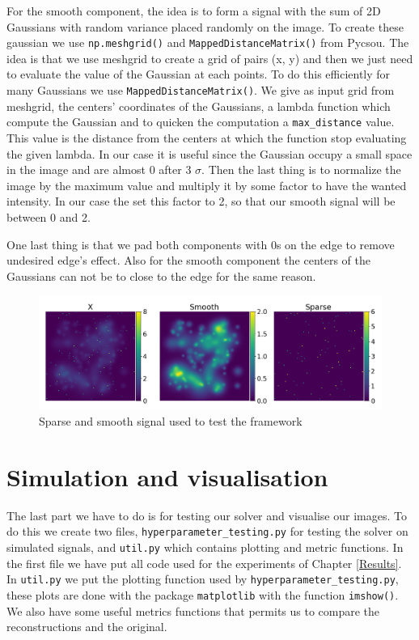 \documentclass[a4paper,11pt,oneside]{report}
\theoremstyle{named}
\begin{document}
For the smooth component, the idea is to form a signal with the sum of 2D Gaussians with random variance placed randomly on the image. To create these gaussian we use \verb+np.meshgrid()+ and \verb+MappedDistanceMatrix()+ from Pycsou. The idea is that we use meshgrid to create a grid of pairs (x, y) and then we just need to evaluate the value of the Gaussian at each points. To do this efficiently for many Gaussians we use \verb+MappedDistanceMatrix()+. We give as input grid from meshgrid, the centers' coordinates of the Gaussians, a lambda function which compute the Gaussian and to quicken the computation a \verb+max_distance+ value. This value is the distance from the centers at which the function stop evaluating the given lambda. In our case it is useful since the Gaussian occupy a small space in the image and are almost 0 after 3 $\sigma$. Then the last thing is to normalize the image by the maximum value and multiply it by some factor to have the wanted intensity. In our case the set this factor to 2, so that our smooth signal will be between 0 and 2.

One last thing is that we pad both components with 0s on the edge to remove undesired edge's effect. Also for the smooth component the centers of the Gaussians can not be to close to the edge for the same reason.

\begin{figure}
    \centering
    \includegraphics[width=1\textwidth]{SpareSmoothSignal.png}
    \caption{Sparse and smooth signal used to test the framework}
    \label{fig:SpareSmoothSignal}
\end{figure}

\section{Simulation and visualisation}
The last part we have to do is for testing our solver and visualise our images. To do this we create two files,  \verb+hyperparameter_testing.py+ for testing the solver on simulated signals, and \verb+util.py+ which contains plotting and metric functions. In the first file we have put all code used for the experiments of Chapter \ref{Results}. In \verb+util.py+ we put the plotting function used by \verb+hyperparameter_testing.py+, these plots are done with the package \verb+matplotlib+ with the function \verb+imshow()+. We also have some useful metrics functions that permits us to compare the reconstructions and the original.
\end{document}
